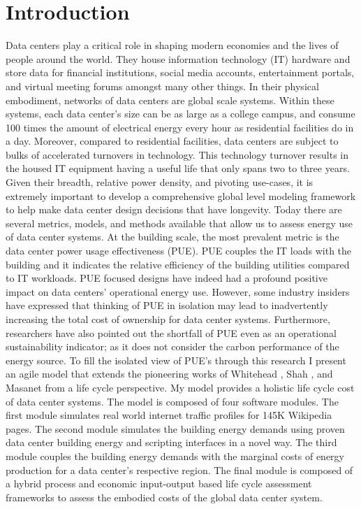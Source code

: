 \section{Introduction}

Data centers play a critical role in shaping modern economies and the lives of people around the world. They house information technology (IT) hardware and store data for financial institutions, social media accounts, entertainment portals, and virtual meeting forums amongst many other things. In their physical embodiment, networks of data centers are global scale systems. Within these systems, each data center’s size can be as large as a college campus, and consume 100 times the amount of electrical energy every hour as residential facilities do in a day. Moreover, compared to residential facilities, data centers are subject to bulks of accelerated turnovers in technology. This technology turnover results in the housed IT equipment having a useful life that only spans two to three years. Given their breadth, relative power density, and pivoting use-cases, it is extremely important to develop a comprehensive global level modeling framework to help make data center design decisions that have longevity.
Today there are several metrics, models, and methods available that allow us to assess energy use of data center systems. At the building scale, the most prevalent metric is the data center power usage effectiveness (PUE). PUE couples the IT loads with the building and it indicates the relative efficiency of the building utilities compared to IT workloads. PUE focused designs have indeed had a profound positive impact on data centers' operational energy use. However, some industry insiders have expressed that thinking of PUE in isolation may lead to inadvertently increasing the total cost of ownership for data center systems. Furthermore, researchers have also pointed out the shortfall of PUE even as an operational sustainability indicator; as it does not consider the carbon performance of the energy source.
To fill the isolated view of PUE’s through this research I present an agile model that extends the pioneering works of Whitehead \cite{whitehead15}, Shah \cite{shah11}, and Masanet \cite{CLEER13} from a life cycle perspective. My model provides a holistic life cycle cost of data center systems. The model is composed of four software modules. The first module simulates real world internet traffic profiles for 145K Wikipedia pages. The second module simulates the building energy demands using proven data center building energy and scripting interfaces in a novel way. The third module couples the building energy demands with the marginal costs of energy production for a data center’s respective region. The final module is composed of a hybrid process and economic input-output based life cycle assessment frameworks to assess the embodied costs of the global data center system.
